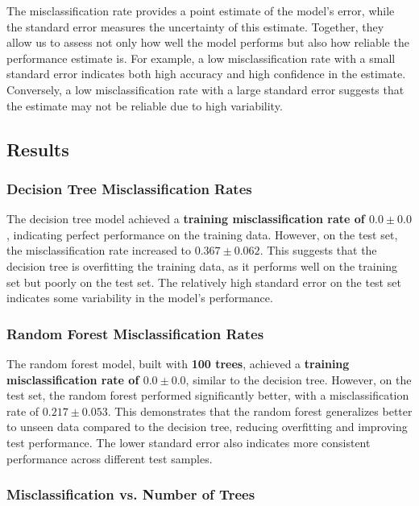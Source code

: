 \documentclass[fleqn,moreauthors,10pt]{ds_report}
\begin{document}
The misclassification rate provides a point estimate of the model's error, while the standard error measures the uncertainty of this estimate. Together, they allow us to assess not only how well the model performs but also how reliable the performance estimate is. For example, a low misclassification rate with a small standard error indicates both high accuracy and high confidence in the estimate. Conversely, a low misclassification rate with a large standard error suggests that the estimate may not be reliable due to high variability.


\subsection*{Results}

\subsubsection*{Decision Tree Misclassification Rates}

The decision tree model achieved a \textbf{training misclassification rate of \(0.0 \pm 0.0\)}, indicating perfect performance on the training data. However, on the test set, the misclassification rate increased to \(\mathbf{0.367 \pm 0.062}\). This suggests that the decision tree is overfitting the training data, as it performs well on the training set but poorly on the test set. The relatively high standard error on the test set indicates some variability in the model's performance.


\subsubsection*{Random Forest Misclassification Rates}

The random forest model, built with \textbf{100 trees}, achieved a \textbf{training misclassification rate of \(0.0 \pm 0.0\)}, similar to the decision tree. However, on the test set, the random forest performed significantly better, with a misclassification rate of \(\mathbf{0.217 \pm 0.053}\). This demonstrates that the random forest generalizes better to unseen data compared to the decision tree, reducing overfitting and improving test performance. The lower standard error also indicates more consistent performance across different test samples.

\subsubsection*{Misclassification vs. Number of Trees}
\end{document}
